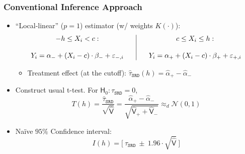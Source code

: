 \documentclass[9pt]{beamer}
\renewcommand{\c}{c}
\begin{document}
\begin{frame}\frametitle{Conventional Inference Approach}
	\begin{itemize}
		\item ``Local-linear'' ($p=1$) estimator (w/ weights $K(\cdot)$):\medskip
		\[%
		\begin{tabular}
			[c]{cc|cc}%
			$-h\leq X_{i}<\c:$ &  &  & $\c\leq X_{i}\leq h:$\\
			&  &  & \\
			$Y_{i}=\alpha_{-}+(X_{i}-\c)\cdot\beta_{-}+\varepsilon_{-,i}$ &  &  &
			$Y_{i}=\alpha_{+}+(X_{i}-\c)\cdot\beta_{+}+\varepsilon_{+,i}$%
		\end{tabular}
		\]
		\medskip
		
		\begin{itemize}
			\item Treatment effect (at the cutoff): $\hat{\tau}_{\mathtt{SRD}}(h)=\hat{\alpha}_{+}-\hat{\alpha}_{-}$\bigskip
		\end{itemize}
	
		\item Construct usual t-test. For $\mathsf{H}_{0}:\tau_{\mathtt{SRD}}=0$,
		\[T(h)=\frac{\hat{\tau}_{\mathtt{SRD}}}{\sqrt{\mathsf{\hat{V}}}}
		  =\frac{\hat{\alpha}_{+}-\hat{\alpha}_{-}}{\sqrt{\mathsf{\hat{V}}_{+}+\mathsf{\hat{V}}_{-}}}\approx_{d}\mathcal{N}(0,1)
		\]
		\smallskip
		
		\item Na\"ive $95\%$ Confidence interval:
		\[I(h)=\Big[  ~\hat{\tau}_{\mathtt{SRD}}~\pm~1.96\cdot\sqrt{\mathsf{\hat{V}}} ~\Big]\]
	\end{itemize}
\end{frame}
\end{document}
